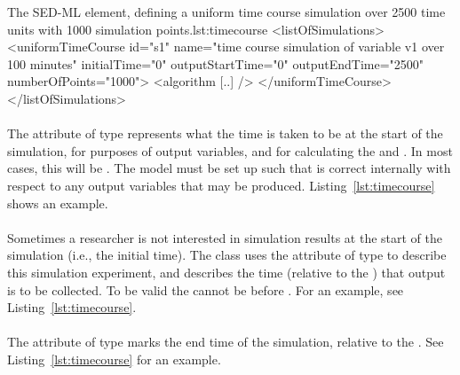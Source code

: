 
\begin{myXmlLst}{The SED-ML  element, defining a uniform time course simulation over 2500 time units with 1000 simulation points.}{lst:timecourse}
<listOfSimulations>
	<uniformTimeCourse id="s1"  name="time course simulation of variable v1 over 100 minutes"  
		initialTime="0" outputStartTime="0" outputEndTime="2500" numberOfPoints="1000">
		<algorithm [..] />
 	</uniformTimeCourse>
</listOfSimulations>
\end{myXmlLst}

\paragraph*{}
\label{sec:initialTime}
The attribute  of type  represents what the time is taken to be at the start of the simulation, for purposes of output variables, and for calculating the  and .  In most cases, this will be .  The model must be set up such that  is correct internally with respect to any output variables that may be produced.
Listing~\ref{lst:timecourse} shows an example. 

\paragraph*{}
\label{sec:outputStartTime}
Sometimes a researcher is not interested in simulation results at the start of the simulation (i.e., the initial time). The \hyperref[class:uniformTimeCourse]{} class uses the attribute  of type  to describe this simulation experiment, and describes the time (relative to the ) that output is to be collected. To be valid the  cannot be before \hyperref[sec:initialTime]{}. For an example, see Listing~\ref{lst:timecourse}. 

\paragraph*{}
\label{sec:outputEndTime}
The attribute  of type  marks the end time of the simulation, relative to the . See Listing~\ref{lst:timecourse} for an example. 

